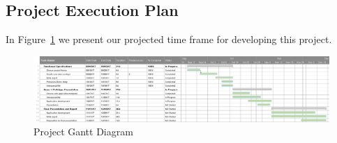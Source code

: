 \documentclass[a4paper]{article}
\begin{document}
\begin{landscape}
\thispagestyle{empty}
\section{Project Execution Plan}

In Figure~\ref{fig:gantt} we present our projected time frame for developing this project.

\begin{figure}[!ht]
    \includegraphics[width=1.4\textwidth]{imgs/gantt.png}
    \caption{Project Gantt Diagram}
    \label{fig:gantt}
\end{figure}



\nocite{business_dashboard}
\nocite{kpis_def}
\nocite{business_dashboards}




\vfill
\raisebox{0cm}{\makebox[\linewidth]{\thepage}}
\end{landscape}
\end{document}
